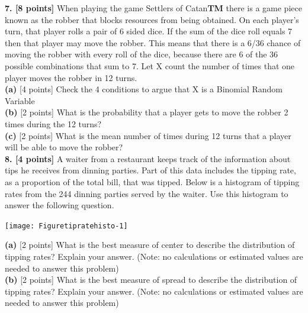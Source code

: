 \documentclass[11pt]{isuthesis}\usepackage[]{graphicx}\usepackage[]{color}
\newenvironment{knitrout}{}{} %
\begin{document}
\begin{appendices}

\textbf{7. [8 points]} When playing the game Settlers of Catan\textbf{TM} there is a game piece known as the robber that blocks resources from being obtained.  On each player's turn, that player rolls a pair of 6 sided dice.  If the sum of the dice roll equals 7 then that player may move the robber. This means that there is a 6/36 chance of moving the robber with every roll of the dice, because there are 6 of the 36 possible combinations that sum to 7. Let X count the number of times that one player moves the robber in 12 turns.\\
\noindent\textbf{(a)} [4 points]  Check the 4 conditions to argue that X is a Binomial Random Variable  \\
\noindent\textbf{(b)} [2 points]  What is the probability that a player gets to move the robber 2 times during the 12 turns?  \\
\noindent\textbf{(c)} [2 points]  What is the mean number of times during 12 turns that a player will be able to move the robber?\\


\textbf{8. [4 points]} A waiter from a restaurant keeps track of the information about tips he receives from dinning parties. Part of this data includes the tipping rate, as a proportion of the total bill, that was tipped. Below is a histogram of tipping rates from the 244 dinning parties served by the waiter. Use this histogram to answer the following question.
\begin{knitrout}
\color{fgcolor}

{\centering \texttt{[image: Figuretipratehisto-1]} 

}



\end{knitrout}
\noindent\textbf{(a)} [2 points]  What is the best measure of center to describe the distribution of tipping rates? Explain your answer. (Note: no calculations or estimated values are needed to answer this problem)  \\
\noindent\textbf{(b)} [2 points]  What is the best measure of spread to describe the distribution of tipping rates? Explain your answer. (Note: no calculations or estimated values are needed to answer this problem) \\


\end{appendices}
\end{document}

